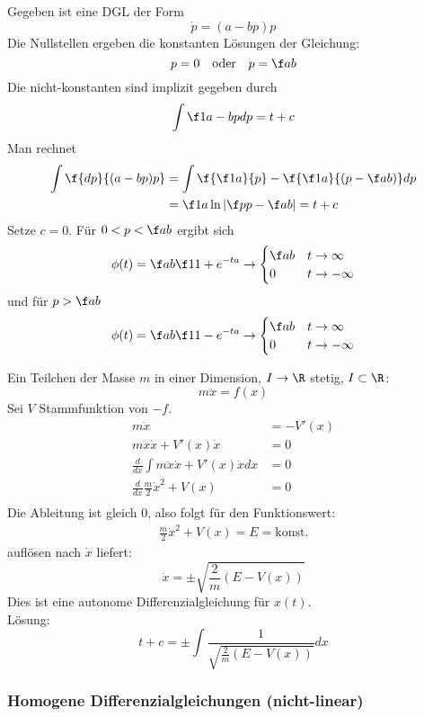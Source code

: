\documentclass[a4paper,10pt]{scrartcl}
\begin{document}
\begin{ex*}
	Gegeben ist eine DGL der Form
	\[
		\dot p = (a-bp)p
	\]
	Die Nullstellen ergeben die konstanten Lösungen der Gleichung:
	\[
		p = 0 \quad \text{oder} \quad p = \f ab
	\]
	Die nicht-konstanten sind implizit gegeben durch
	\[
		\int \f 1{a-bp}dp = t +c
	\]
	Man rechnet
	\begin{align*}
		\int \f {dp}{(a-bp)p} &= \int \f {\f 1a}{p} - \f {\f 1a}{(p-\f ab)}dp\\
							  &= \f 1a \ln \left| \f p{p-\f ab}\right| = t +c
	\end{align*}
	Setze $c=0$.
	Für $0<p<\f ab$ ergibt sich
	\[
		\phi(t) = \f ab \f 1{1+e^{-ta}} \to \begin{cases} \f ab & t\to \infty \\ 0 & t\to -\infty\end{cases}
	\]
	und für $p> \f ab$
	\[
		\phi(t) = \f ab \f 1{1-e^{-ta}} \to \begin{cases}\f ab & t \to \infty\\0 & t\to -\infty\end{cases}
	\]
\end{ex*}

\begin{ex*}

Ein Teilchen der Masse $m$ in einer Dimension, $I\to \R$ stetig, $I\subset \R$:
\[
m\ddot x=f(x)
\]
Sei $V$ Stammfunktion von $-f$.
\begin{align*}
m\ddot x &= -V'(x) \\
m\ddot x \dot x + V'(x)\dot x &= 0 \\
\frac d{dx} \int m \ddot x\dot x + V'(x)\dot xdx &= 0\\
\frac d{dx} \frac m2 \dot x^2 + V(x) &= 0\\
\end{align*}
Die Ableitung ist gleich $0$, also folgt für den Funktionswert:
\begin{align*}
\frac m2 \dot x^2 + V(x) = E = \text{konst.}
\end{align*}
auflösen nach $\dot x$ liefert:
\[
\dot x = \pm\sqrt{\frac 2m (E-V(x))}
\]
Dies ist eine autonome Differenzialgleichung für $x(t)$.\\
Lösung:\\
\[
t+c = \pm \int \frac{1}{\sqrt{\frac{2}{m}(E-V(x))}}dx
\]
\end{ex*}


\subsubsection{Homogene Differenzialgleichungen (nicht-linear)}
\end{document}

